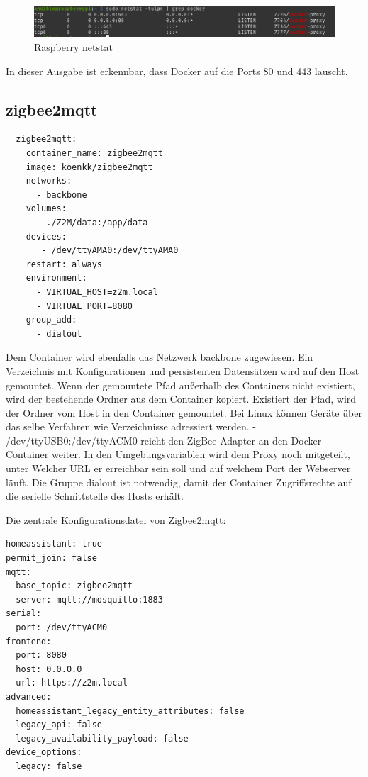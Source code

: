 \begin{figure}[H]
  \centering
  \includegraphics[width=1\textwidth]{media/rasp-netstat.png}
  \caption{Raspberry netstat}
\end{figure}
In dieser Ausgabe ist erkennbar, dass Docker auf die Ports 80 und 443 lauscht.

\subsection{zigbee2mqtt}
\begin{lstlisting}
  zigbee2mqtt:
    container_name: zigbee2mqtt
    image: koenkk/zigbee2mqtt
    networks:
      - backbone
    volumes:
      - ./Z2M/data:/app/data
    devices:
       - /dev/ttyAMA0:/dev/ttyAMA0
    restart: always
    environment:
      - VIRTUAL_HOST=z2m.local
      - VIRTUAL_PORT=8080
    group_add:
      - dialout
\end{lstlisting}

Dem Container wird ebenfalls das Netzwerk \grqq backbone\grqq{} zugewiesen. Ein Verzeichnis mit Konfigurationen und persistenten Datensätzen wird auf den Host gemountet. Wenn der gemountete Pfad außerhalb des Containers nicht existiert, wird der 
bestehende Ordner aus dem Container kopiert. Existiert der Pfad, wird der Ordner vom Host in den Container gemountet. 
Bei Linux können Geräte über das selbe Verfahren wie Verzeichnisse adressiert werden. \grqq - /dev/ttyUSB0:/dev/ttyACM0\grqq{} reicht den ZigBee Adapter an 
den Docker Container weiter.
In den Umgebungsvariablen wird dem Proxy noch mitgeteilt, unter Welcher URL er erreichbar sein soll und auf welchem Port der Webserver läuft. Die Gruppe 
\grqq dialout\grqq{} ist notwendig, damit der Container Zugriffsrechte auf die serielle Schnittstelle des Hosts erhält.

Die zentrale Konfigurationsdatei von Zigbee2mqtt:
\begin{lstlisting}
homeassistant: true
permit_join: false
mqtt:
  base_topic: zigbee2mqtt
  server: mqtt://mosquitto:1883
serial:
  port: /dev/ttyACM0
frontend:
  port: 8080
  host: 0.0.0.0
  url: https://z2m.local
advanced:
  homeassistant_legacy_entity_attributes: false
  legacy_api: false
  legacy_availability_payload: false
device_options:
  legacy: false
\end{lstlisting}

